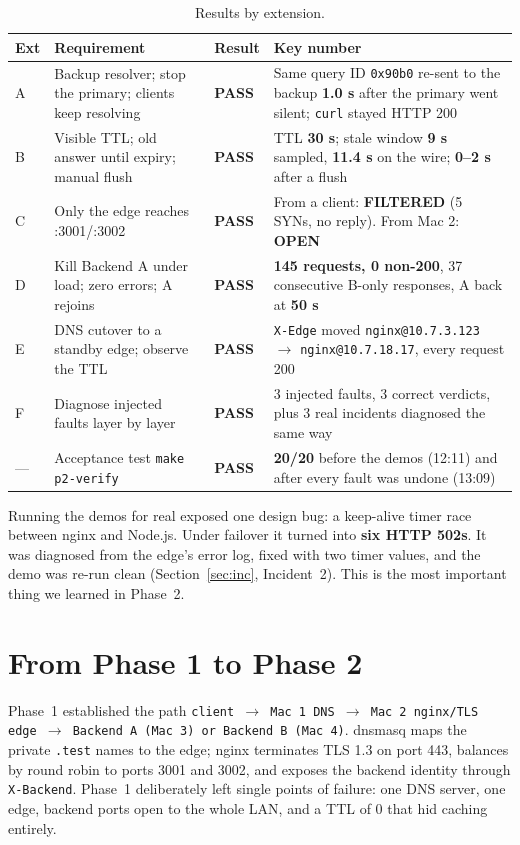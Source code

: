 \documentclass[11pt,a4paper]{article}
\newcommand{\pass}{\textcolor{lmGreen}{\textbf{PASS}}}
\begin{document}
\begin{table}[!htbp]
\centering
\caption{Results by extension.}
{\small
\begin{tabular}{@{}L{0.7cm}L{4.3cm}L{1.15cm}L{8.2cm}@{}}
\toprule
\textbf{Ext} & \textbf{Requirement} & \textbf{Result} & \textbf{Key number} \\
\midrule
A & Backup resolver; stop the primary; clients keep resolving & \pass & Same query ID \texttt{0x90b0} re-sent to the backup \textbf{1.0 s} after the primary went silent; \texttt{curl} stayed HTTP 200 \\
B & Visible TTL; old answer until expiry; manual flush & \pass & TTL \textbf{30 s}; stale window \textbf{9 s} sampled, \textbf{11.4 s} on the wire; \textbf{0--2 s} after a flush \\
C & Only the edge reaches :3001/:3002 & \pass & From a client: \textbf{FILTERED} (5 SYNs, no reply). From Mac 2: \textbf{OPEN} \\
D & Kill Backend A under load; zero errors; A rejoins & \pass & \textbf{145 requests, 0 non-200}, 37 consecutive B-only responses, A back at \textbf{50 s} \\
E & DNS cutover to a standby edge; observe the TTL & \pass & \texttt{X-Edge} moved \texttt{nginx@10.7.3.123} $\to$ \texttt{nginx@10.7.18.17}, every request 200 \\
F & Diagnose injected faults layer by layer & \pass & 3 injected faults, 3 correct verdicts, plus 3 real incidents diagnosed the same way \\
--- & Acceptance test \texttt{make p2-verify} & \pass & \textbf{20/20} before the demos (12:11) and after every fault was undone (13:09) \\
\bottomrule
\end{tabular}}
\end{table}

Running the demos for real exposed one design bug: a keep-alive timer race between nginx and
Node.js. Under failover it turned into \textbf{six HTTP 502s}. It was diagnosed from the edge's
error log, fixed with two timer values, and the demo was re-run clean (Section~\ref{sec:inc},
Incident~2). This is the most important thing we learned in Phase~2.

\section{From Phase 1 to Phase 2}
Phase~1 established the path
\texttt{client $\to$ Mac 1 DNS $\to$ Mac 2 nginx/TLS edge $\to$ Backend A (Mac 3) or Backend B (Mac 4)}.
dnsmasq maps the private \texttt{.test} names to the edge; nginx terminates TLS 1.3 on port 443,
balances by round robin to ports 3001 and 3002, and exposes the backend identity through
\texttt{X-Backend}. Phase~1 deliberately left single points of failure: one DNS server, one
edge, backend ports open to the whole LAN, and a TTL of 0 that hid caching entirely.
\end{document}
